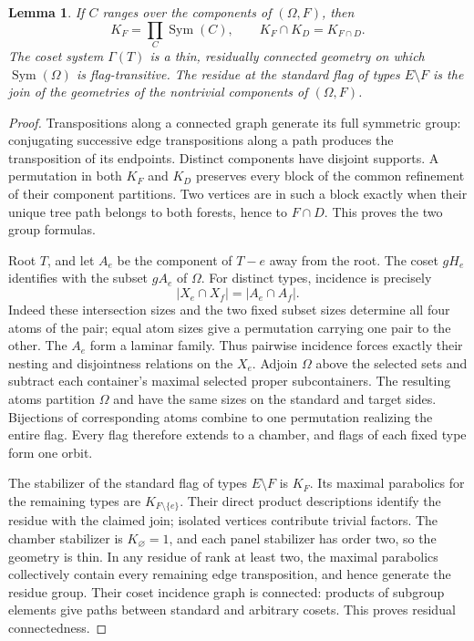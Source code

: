 \documentclass[11pt,a4paper]{article}
\newtheorem{lemma}[theorem]{Lemma}
\newcommand{\Sym}{\operatorname{Sym}}
\begin{document}
\begin{lemma}\label{forest}
If $C$ ranges over the components of $(\Omega,F)$, then
\[
 K_F=\prod_C\Sym(C),\qquad K_F\cap K_D=K_{F\cap D}.
\]
The coset system $\Gamma(T)$ is a thin, residually connected geometry on
which $\Sym(\Omega)$ is flag-transitive. The residue at the standard flag
of types $E\setminus F$ is the join of the geometries of the nontrivial
components of $(\Omega,F)$.
\end{lemma}
\begin{proof}
Transpositions along a connected graph generate its full symmetric group:
conjugating successive edge transpositions along a path produces the
transposition of its endpoints. Distinct components have disjoint
supports. A permutation in both $K_F$ and $K_D$ preserves every block of
the common refinement of their component partitions. Two vertices are
in such a block exactly when their unique tree path belongs to both
forests, hence to $F\cap D$. This proves the two group formulas.

Root $T$, and let $A_e$ be the component of $T-e$ away from the root.
The coset $gH_e$ identifies with the subset $gA_e$ of $\Omega$.
For distinct types, incidence is precisely
\[
 |X_e\cap X_f|=|A_e\cap A_f|.
\]
Indeed these intersection sizes and the two fixed subset sizes determine
all four atoms of the pair; equal atom sizes give a permutation carrying
one pair to the other. The $A_e$ form a laminar family. Thus pairwise
incidence forces exactly their nesting and disjointness relations on the
$X_e$. Adjoin $\Omega$ above the selected sets and subtract each
container's maximal selected proper subcontainers. The resulting atoms
partition $\Omega$ and have the same sizes on the standard and target
sides. Bijections of corresponding atoms combine to one permutation
realizing the entire flag. Every flag therefore extends to a chamber,
and flags of each fixed type form one orbit.

The stabilizer of the standard flag of types $E\setminus F$ is $K_F$.
Its maximal parabolics for the remaining types are $K_{F\setminus\{e\}}$.
Their direct product descriptions identify the residue with the claimed
join; isolated vertices contribute trivial factors. The chamber
stabilizer is $K_\varnothing=1$, and each panel stabilizer has order two,
so the geometry is thin. In any residue of rank at least two, the
maximal parabolics collectively contain every remaining edge
transposition, and hence generate the residue group. Their coset
incidence graph is connected: products of subgroup elements give paths
between standard and arbitrary cosets. This proves residual connectedness.
\end{proof}
\end{document}
